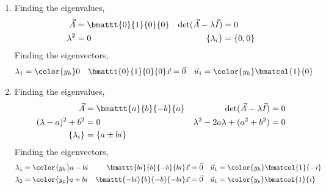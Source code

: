 \begin{enumerate}
    \item Finding the eigenvalues,
          \begin{align}
              \vec{A}                        & = \bmattt{0}{1}{0}{0} &
              \det(\vec{A} - \lambda\vec{I}) & = 0                     \\
              \lambda^2                      & = 0                   &
              \{\lambda_i\}                  & = \{0, 0\}
          \end{align}
          Finding the eigenvectors,
          \begin{align}
              \lambda_1                   & = \color{y_h} 0 &
              \bmattt{0}{1}{0}{0} \vec{x} & = \vec{0}       &
              \vec{u}_1                   & = \color{y_h}
              \bmatcol{1}{0}
          \end{align}

    \item Finding the eigenvalues,
          \begin{align}
              \vec{A}                              & = \bmattt{a}{b}{-b}{a} &
              \det(\vec{A} - \lambda\vec{I})       & = 0                      \\
              (\lambda - a)^2 + b^2                & = 0                    &
              \lambda^2 - 2a \lambda + (a^2 + b^2) & = 0                      \\
              \{\lambda_i\}                        & = \{a \pm bi\}
          \end{align}
          Finding the eigenvectors,
          \begin{align}
              \lambda_1                        & = \color{y_h} a - bi &
              \bmattt{bi}{b}{-b}{bi} \vec{x}   & = \vec{0}            &
              \vec{u}_1                        & = \color{y_h}
              \bmatcol{1}{-i}                                           \\
              \lambda_2                        & = \color{y_p} a + bi &
              \bmattt{-bi}{b}{-b}{-bi} \vec{x} & = \vec{0}            &
              \vec{u}_1                        & = \color{y_p}
              \bmatcol{1}{i}
          \end{align}


\end{enumerate}
